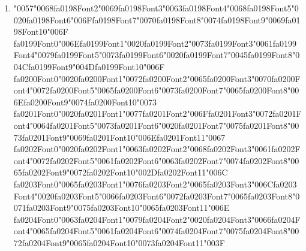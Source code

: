 \documentclass[12pt]{article}
\begin{document}
\begin{enumerate}[label=Q\arabic*.]
 \item {\char"0057}{\char"0068}{\csname fa0198Font2\endcsname\char"0069}{\csname fa0198Font3\endcsname\char"0063}{\csname fa0198Font4\endcsname\char"0068}{\csname fa0198Font5\endcsname\char"0020}{\csname fa0198Font6\endcsname\char"006F}{\csname fa0198Font7\endcsname\char"0070}{\csname fa0198Font8\endcsname\char"0074}{\csname fa0198Font9\endcsname\char"0069}{\csname fa0198Font10\endcsname\char"006F} {\csname fa0199Font0\endcsname\char"006E}{\csname fa0199Font1\endcsname\char"0020}{\csname fa0199Font2\endcsname\char"0073}{\csname fa0199Font3\endcsname\char"0061}{\csname fa0199Font4\endcsname\char"0079}{\csname fa0199Font5\endcsname\char"0073}{\csname fa0199Font6\endcsname\char"0020}{\csname fa0199Font7\endcsname\char"0045}{\csname fa0199Font8\endcsname\char"004C}{\csname fa0199Font9\endcsname\char"004D}{\csname fa0199Font10\endcsname\char"006F} {\csname fa0200Font0\endcsname\char"0020}{\csname fa0200Font1\endcsname\char"0072}{\csname fa0200Font2\endcsname\char"0065}{\csname fa0200Font3\endcsname\char"0070}{\csname fa0200Font4\endcsname\char"0072}{\csname fa0200Font5\endcsname\char"0065}{\csname fa0200Font6\endcsname\char"0073}{\csname fa0200Font7\endcsname\char"0065}{\csname fa0200Font8\endcsname\char"006E}{\csname fa0200Font9\endcsname\char"0074}{\csname fa0200Font10\endcsname\char"0073} {\csname fa0201Font0\endcsname\char"0020}{\csname fa0201Font1\endcsname\char"0077}{\csname fa0201Font2\endcsname\char"006F}{\csname fa0201Font3\endcsname\char"0072}{\csname fa0201Font4\endcsname\char"0064}{\csname fa0201Font5\endcsname\char"0073}{\csname fa0201Font6\endcsname\char"0020}{\csname fa0201Font7\endcsname\char"0075}{\csname fa0201Font8\endcsname\char"0073}{\csname fa0201Font9\endcsname\char"0069}{\csname fa0201Font10\endcsname\char"006E}{\csname fa0201Font11\endcsname\char"0067} {\csname fa0202Font0\endcsname\char"0020}{\csname fa0202Font1\endcsname\char"0063}{\csname fa0202Font2\endcsname\char"0068}{\csname fa0202Font3\endcsname\char"0061}{\csname fa0202Font4\endcsname\char"0072}{\csname fa0202Font5\endcsname\char"0061}{\csname fa0202Font6\endcsname\char"0063}{\csname fa0202Font7\endcsname\char"0074}{\csname fa0202Font8\endcsname\char"0065}{\csname fa0202Font9\endcsname\char"0072}{\csname fa0202Font10\endcsname\char"002D}{\csname fa0202Font11\endcsname\char"006C} {\csname fa0203Font0\endcsname\char"0065}{\csname fa0203Font1\endcsname\char"0076}{\csname fa0203Font2\endcsname\char"0065}{\csname fa0203Font3\endcsname\char"006C}{\csname fa0203Font4\endcsname\char"0020}{\csname fa0203Font5\endcsname\char"0066}{\csname fa0203Font6\endcsname\char"0072}{\csname fa0203Font7\endcsname\char"0065}{\csname fa0203Font8\endcsname\char"0071}{\csname fa0203Font9\endcsname\char"0075}{\csname fa0203Font10\endcsname\char"0065}{\csname fa0203Font11\endcsname\char"006E} {\csname fa0204Font0\endcsname\char"0063}{\csname fa0204Font1\endcsname\char"0079}{\csname fa0204Font2\endcsname\char"0020}{\csname fa0204Font3\endcsname\char"0066}{\csname fa0204Font4\endcsname\char"0065}{\csname fa0204Font5\endcsname\char"0061}{\csname fa0204Font6\endcsname\char"0074}{\csname fa0204Font7\endcsname\char"0075}{\csname fa0204Font8\endcsname\char"0072}{\csname fa0204Font9\endcsname\char"0065}{\csname fa0204Font10\endcsname\char"0073}{\csname fa0204Font11\endcsname\char"003F}

\end{enumerate}
\end{document}

